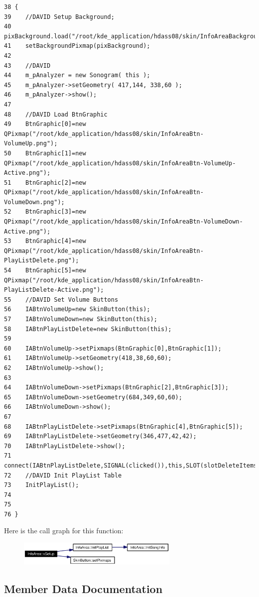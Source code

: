 \footnotesize\begin{verbatim}38 {
39    //DAVID Setup Background;
40    pixBackground.load("/root/kde_application/hdass08/skin/InfoAreaBackground.png");
41    setBackgroundPixmap(pixBackground);
42    
43    //DAVID
44    m_pAnalyzer = new Sonogram( this );            
45    m_pAnalyzer->setGeometry( 417,144, 338,60 );
46    m_pAnalyzer->show();
47    
48    //DAVID Load BtnGraphic
49    BtnGraphic[0]=new QPixmap("/root/kde_application/hdass08/skin/InfoAreaBtn-VolumeUp.png");
50    BtnGraphic[1]=new QPixmap("/root/kde_application/hdass08/skin/InfoAreaBtn-VolumeUp-Active.png");
51    BtnGraphic[2]=new QPixmap("/root/kde_application/hdass08/skin/InfoAreaBtn-VolumeDown.png");
52    BtnGraphic[3]=new QPixmap("/root/kde_application/hdass08/skin/InfoAreaBtn-VolumeDown-Active.png");
53    BtnGraphic[4]=new QPixmap("/root/kde_application/hdass08/skin/InfoAreaBtn-PlayListDelete.png");
54    BtnGraphic[5]=new QPixmap("/root/kde_application/hdass08/skin/InfoAreaBtn-PlayListDelete-Active.png");
55    //DAVID Set Volume Buttons
56    IABtnVolumeUp=new SkinButton(this);
57    IABtnVolumeDown=new SkinButton(this);
58    IABtnPlayListDelete=new SkinButton(this);
59 
60    IABtnVolumeUp->setPixmaps(BtnGraphic[0],BtnGraphic[1]);
61    IABtnVolumeUp->setGeometry(418,38,60,60);
62    IABtnVolumeUp->show();
63    
64    IABtnVolumeDown->setPixmaps(BtnGraphic[2],BtnGraphic[3]);
65    IABtnVolumeDown->setGeometry(684,349,60,60);
66    IABtnVolumeDown->show();
67    
68    IABtnPlayListDelete->setPixmaps(BtnGraphic[4],BtnGraphic[5]);
69    IABtnPlayListDelete->setGeometry(346,477,42,42);
70    IABtnPlayListDelete->show();
71    connect(IABtnPlayListDelete,SIGNAL(clicked()),this,SLOT(slotDeleteItems()));
72    //DAVID Init PlayList Table
73    InitPlayList();
74    
75    
76 }
\end{verbatim}\normalsize 


Here is the call graph for this function:\begin{figure}[H]
\begin{center}
\leavevmode
\includegraphics[width=219pt]{classInfoArea_InfoAreaa1_cgraph}
\end{center}
\end{figure}


\subsection{Member Data Documentation}

